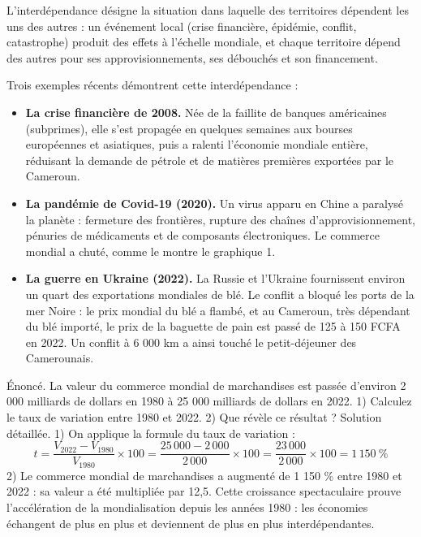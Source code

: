 \documentclass[11pt]{article}
\newcommand{\cle}[1]{{\popxbold\color{popdark}#1}}
\newcounter{popsec}
\newcounter{popsub}
\newcommand{\courssub}[1]{%
  \stepcounter{popsub}%
  \par\vspace{9pt}\noindent{\popxbold\fontsize{11.5}{13}\selectfont\color{popink}{\color{poporange}\thepopsec.\thepopsub}\hspace{6pt}#1}\par\nopagebreak\vspace{4pt}
}
\begin{document}
\courssub{L'interdépendance des territoires}

\begin{definition}[L'interdépendance]
L'\cle{interdépendance} désigne la situation dans laquelle des territoires dépendent les uns des autres : un événement local (crise financière, épidémie, conflit, catastrophe) produit des effets à l'échelle mondiale, et chaque territoire dépend des autres pour ses approvisionnements, ses débouchés et son financement.
\end{definition}

Trois exemples récents démontrent cette interdépendance :

\begin{itemize}
\item \textbf{La crise financière de 2008.} Née de la faillite de banques américaines (subprimes), elle s'est propagée en quelques semaines aux bourses européennes et asiatiques, puis a ralenti l'économie mondiale entière, réduisant la demande de pétrole et de matières premières exportées par le Cameroun.
\item \textbf{La pandémie de Covid-19 (2020).} Un virus apparu en Chine a paralysé la planète : fermeture des frontières, rupture des chaînes d'approvisionnement, pénuries de médicaments et de composants électroniques. Le commerce mondial a chuté, comme le montre le graphique 1.
\item \textbf{La guerre en Ukraine (2022).} La Russie et l'Ukraine fournissent environ un quart des exportations mondiales de blé. Le conflit a bloqué les ports de la mer Noire : le prix mondial du blé a flambé, et au Cameroun, très dépendant du blé importé, le prix de la baguette de pain est passé de 125 à 150 FCFA en 2022. Un conflit à 6 000 km a ainsi touché le petit-déjeuner des Camerounais.
\end{itemize}

\begin{exoresolu}
Énoncé. La valeur du commerce mondial de marchandises est passée d'environ 2 000 milliards de dollars en 1980 à 25 000 milliards de dollars en 2022. 1) Calculez le taux de variation entre 1980 et 2022. 2) Que révèle ce résultat ?
\tcblower
Solution détaillée.
1) On applique la formule du taux de variation :
\[ t = \frac{V_{2022}-V_{1980}}{V_{1980}}\times 100 = \frac{25\,000-2\,000}{2\,000}\times 100 = \frac{23\,000}{2\,000}\times 100 = 1\,150\ \% \]
2) Le commerce mondial de marchandises a augmenté de 1 150 \% entre 1980 et 2022 : sa valeur a été multipliée par 12,5. Cette croissance spectaculaire prouve l'accélération de la mondialisation depuis les années 1980 : les économies échangent de plus en plus et deviennent de plus en plus interdépendantes.
\end{exoresolu}
\end{document}
